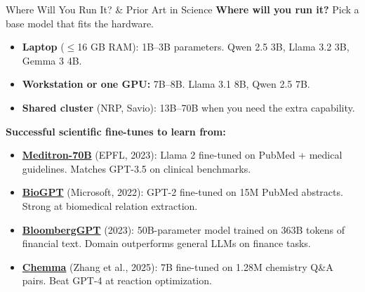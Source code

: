 \documentclass[aspectratio=169]{beamer}
\begin{document}
\begin{frame}{Where Will You Run It? \& Prior Art in Science}
    \textbf{Where will you run it?} Pick a base model that fits the hardware.
    \begin{itemize}
        \vspace{0.2em}
        \item \textbf{Laptop} ($\leq$16 GB RAM): 1B--3B parameters. Qwen 2.5 3B, Llama 3.2 3B, Gemma 3 4B.
        \item \textbf{Workstation or one GPU:} 7B--8B. Llama 3.1 8B, Qwen 2.5 7B.
        \item \textbf{Shared cluster} (NRP, Savio): 13B--70B when you need the extra capability.
    \end{itemize}

    \vspace{0.6em}
    \textbf{Successful scientific fine-tunes to learn from:}
    \begin{itemize}
        \vspace{0.2em}
        \item \href{https://arxiv.org/abs/2311.16079}{\textbf{Meditron-70B}} (EPFL, 2023): Llama 2 fine-tuned on PubMed + medical guidelines. Matches GPT-3.5 on clinical benchmarks.
        \item \href{https://arxiv.org/abs/2210.10341}{\textbf{BioGPT}} (Microsoft, 2022): GPT-2 fine-tuned on 15M PubMed abstracts. Strong at biomedical relation extraction.
        \item \href{https://arxiv.org/abs/2303.17564}{\textbf{BloombergGPT}} (2023): 50B-parameter model trained on 363B tokens of financial text. Domain outperforms general LLMs on finance tasks.
        \item \href{https://arxiv.org/abs/2504.18340}{\textbf{Chemma}} (Zhang et al., 2025): 7B fine-tuned on 1.28M chemistry Q\&A pairs. Beat GPT-4 at reaction optimization.
    \end{itemize}
\end{frame}
\end{document}
